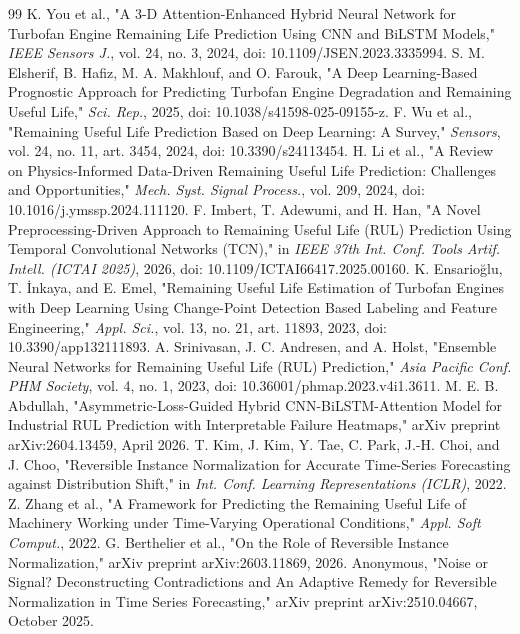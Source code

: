 \documentclass[preprint,10pt]{elsarticle}
\begin{document}
\begin{thebibliography}{99}
  K. You et al., "A 3-D Attention-Enhanced Hybrid Neural Network for Turbofan Engine Remaining Life Prediction Using CNN and BiLSTM Models," \textit{IEEE Sensors J.}, vol. 24, no. 3, 2024, doi: 10.1109/JSEN.2023.3335994.
  S. M. Elsherif, B. Hafiz, M. A. Makhlouf, and O. Farouk, "A Deep Learning-Based Prognostic Approach for Predicting Turbofan Engine Degradation and Remaining Useful Life," \textit{Sci. Rep.}, 2025, doi: 10.1038/s41598-025-09155-z.
  F. Wu et al., "Remaining Useful Life Prediction Based on Deep Learning: A Survey," \textit{Sensors}, vol. 24, no. 11, art. 3454, 2024, doi: 10.3390/s24113454.
  H. Li et al., "A Review on Physics-Informed Data-Driven Remaining Useful Life Prediction: Challenges and Opportunities," \textit{Mech. Syst. Signal Process.}, vol. 209, 2024, doi: 10.1016/j.ymssp.2024.111120.
  F. Imbert, T. Adewumi, and H. Han, "A Novel Preprocessing-Driven Approach to Remaining Useful Life (RUL) Prediction Using Temporal Convolutional Networks (TCN)," in \textit{IEEE 37th Int. Conf. Tools Artif. Intell. (ICTAI 2025)}, 2026, doi: 10.1109/ICTAI66417.2025.00160.
  K. Ensarioğlu, T. İnkaya, and E. Emel, "Remaining Useful Life Estimation of Turbofan Engines with Deep Learning Using Change-Point Detection Based Labeling and Feature Engineering," \textit{Appl. Sci.}, vol. 13, no. 21, art. 11893, 2023, doi: 10.3390/app132111893.
  A. Srinivasan, J. C. Andresen, and A. Holst, "Ensemble Neural Networks for Remaining Useful Life (RUL) Prediction," \textit{Asia Pacific Conf. PHM Society}, vol. 4, no. 1, 2023, doi: 10.36001/phmap.2023.v4i1.3611.
  M. E. B. Abdullah, "Asymmetric-Loss-Guided Hybrid CNN-BiLSTM-Attention Model for Industrial RUL Prediction with Interpretable Failure Heatmaps," arXiv preprint arXiv:2604.13459, April 2026.
  T. Kim, J. Kim, Y. Tae, C. Park, J.-H. Choi, and J. Choo, "Reversible Instance Normalization for Accurate Time-Series Forecasting against Distribution Shift," in \textit{Int. Conf. Learning Representations (ICLR)}, 2022.
  Z. Zhang et al., "A Framework for Predicting the Remaining Useful Life of Machinery Working under Time-Varying Operational Conditions," \textit{Appl. Soft Comput.}, 2022.
  G. Berthelier et al., "On the Role of Reversible Instance Normalization," arXiv preprint arXiv:2603.11869, 2026.
  Anonymous, "Noise or Signal? Deconstructing Contradictions and An Adaptive Remedy for Reversible Normalization in Time Series Forecasting," arXiv preprint arXiv:2510.04667, October 2025.

\end{thebibliography}
\end{document}
